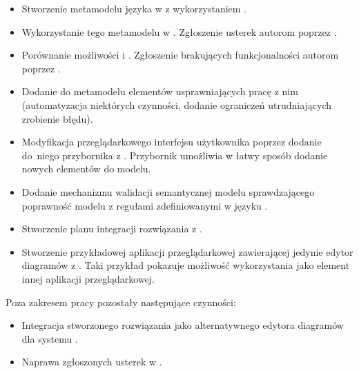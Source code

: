 \begin{itemize}
	\item Stworzenie metamodelu języka \CAL{} w \EMF{}\@ z wykorzystaniem \SiriusDesktop{}.
	\item Wykorzystanie tego metamodelu w \SiriusWeb{}. Zgłoszenie usterek autorom \SiriusWeb{} poprzez \GitHub{}.
	\item Porównanie możliwości \SiriusWeb{} i \SiriusDesktop{}. Zgłoszenie brakujących funkcjonalności autorom \SiriusWeb{} poprzez \GitHub{}.
	\item Dodanie do metamodelu elementów usprawniających pracę z nim (automatyzacja niektórych czynności, dodanie ograniczeń utrudniających zrobienie błędu).
	\item Modyfikacja przeglądarkowego interfejsu użytkownika \SiriusWeb{} poprzez dodanie do~niego przybornika z \BalticLSC{}. Przybornik umożliwia w łatwy sposób dodanie nowych elementów do modelu.
	\item Dodanie mechanizmu walidacji semantycznej modelu sprawdzającego poprawność modelu z regułami zdefiniowanymi w języku \Java{}.
	\item Stworzenie planu integracji rozwiązania z \BalticLSC{}.
	\item Stworzenie przykładowej aplikacji przeglądarkowej zawierającej jedynie edytor diagramów z \SiriusWeb{}. Taki przykład pokazuje możliwość wykorzystania \SiriusWeb{} jako element innej aplikacji przeglądarkowej.
\end{itemize}

\vspace{1em}

\noindent Poza zakresem pracy pozostały następujące czynności:

\begin{itemize}
	\item Integracja stworzonego rozwiązania jako alternatywnego edytora diagramów dla systemu \BalticLSC{}.
	\item Naprawa zgłoszonych usterek w \SiriusWeb{}.
\end{itemize}
